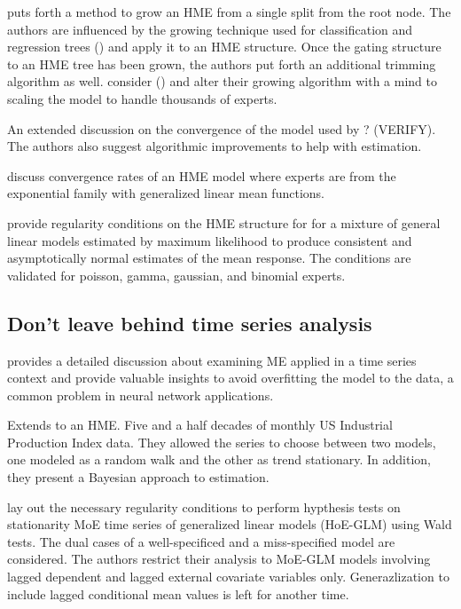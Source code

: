 \documentclass[12pt]{article}
\begin{document}
\bigskip

\cite{WaterhouseRobinson1995} puts forth a method to grow an HME from a 
single split from the root node. The authors are influenced by the growing
technique used for classification and regression trees (\cite{CART1984}) and
apply it to an HME structure. Once the gating structure to an HME tree has
been grown, the authors put forth an additional trimming algorithm as well.
\cite{FFW1997} consider (\cite{WaterhouseRobinson1995}) and alter their
growing algorithm with a mind to scaling the model to handle thousands of
experts.

\cite{JordanXuConverge1995} An extended discussion on the convergence of the
model used by \cite{JordanJacobs1993} ? (VERIFY). The authors also suggest
algorithmic improvements to help with estimation.

\cite{JiangTanner1999} discuss convergence rates of an HME model where experts
are from the exponential family with generalized linear mean functions.

\cite{JiangTanner2000} provide regularity conditions on the HME structure for
for a mixture of general linear models estimated by maximum likelihood to
produce consistent and asymptotically normal estimates of the mean response.
The conditions are validated for poisson, gamma, gaussian, and binomial experts.


\subsection{Don't leave behind time series analysis}

\cite{WMS1995} provides a detailed discussion about examining ME applied in
a time series context and provide valuable insights to avoid overfitting the
model to the data, a common problem in neural network applications.

\cite{HuertaJiangTanner2003} Extends \cite{WMS1995} to an HME.
Five and a half decades of monthly US Industrial Production
Index data. They allowed the series to choose between two models, one modeled
as a random walk and the other as trend stationary. In addition, they present a
Bayesian approach to estimation.

\cite{CarvalhoTanner2003} lay out the necessary regularity conditions to perform
hypthesis tests on stationarity MoE time series of generalized linear models (HoE-GLM)
using Wald tests. The dual cases of a well-specificed and a miss-specified model
are considered. The authors restrict their analysis to MoE-GLM models involving
lagged dependent and lagged external covariate variables only. Generazlization to
include lagged conditional mean values is left for another time.
\end{document}
